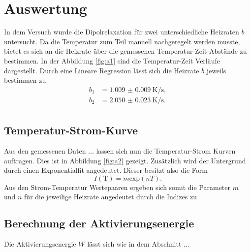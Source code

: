 \section{Auswertung}

In dem Versuch wurde die Dipolrelaxation für zwei unterschiedliche Heizraten $b$ untersucht. Da die Temperatur zum Teil manuell nachgeregelt werden musste, bietet es sich an die Heizrate über
die gemessenen Temperatur-Zeit-Abstände zu bestimmen. In der Abbildung \ref{fig:a1} sind die Temperatur-Zeit Verläufe dargestellt. Durch eine Lineare Regression lässt sich die Heizrate $b$ jeweils bestimmen zu
\begin{align*}
    b_1 &= \SI{1.009(9)}{\kelvin\per\second},\\
    b_2 &= \SI{2.050(23)}{\kelvin\per\second}.\\
\end{align*}
\subsection{Temperatur-Strom-Kurve}

Aus den gemessenen Daten ... lassen sich nun die Temperatur-Strom Kurven auftragen. Dies ist in Abbildung \ref{fig:a2} gezeigt. Zusätzlich wird der Untergrund durch einen Exponentialfit angedeutet. 
Dieser besitzt also die Form
\begin{equation*}
I(\text{T}) = m \text{exp} \left(nT\right).
\end{equation*}
Aus den Strom-Temperatur Wertepaaren ergeben sich somit die Parameter $m$ und $n$ für die jeweilige Heizrate angedeutet durch die Indizes zu


\subsection{Berechnung der Aktivierungsenergie}

Die Aktivierungsenergie $W$ lässt sich wie in dem Abschnitt ...